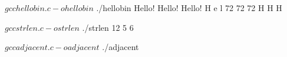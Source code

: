 \documentclass[12pt, oneside, landscape]{article}
\begin{document}


\begin{shell}
$ gcc hellobin.c -o hellobin
$ ./hellobin
Hello!
Hello!
Hello!
H e l
72 72 72
H H H
\end{shell}

\newpage



\begin{shell}
$ gcc strlen.c -o strlen
$ ./strlen
12
5
6
\end{shell}

\vspace{8em}




\begin{shell}
$ gcc adjacent.c -o adjacent
$ ./adjacent
\end{shell}
\end{document}

